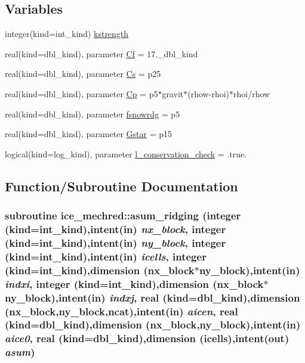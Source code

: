 \subsection*{Variables}
\begin{DoxyCompactItemize}
\item 
integer(kind=int\_\-kind) \hyperlink{namespaceice__mechred_a2272185e4ee38f92dbb9908fca1dac0a}{kstrength}
\item 
real(kind=dbl\_\-kind), parameter \hyperlink{namespaceice__mechred_ae649373b3c64951beea9cf6d3436124a}{Cf} = 17.\_\-dbl\_\-kind
\item 
real(kind=dbl\_\-kind), parameter \hyperlink{namespaceice__mechred_a0cca318f045e71a7ff69619f4186399c}{Cs} = p25
\item 
real(kind=dbl\_\-kind), parameter \hyperlink{namespaceice__mechred_ae1333fb1d2c19a54662644143d18489c}{Cp} = p5$\ast$gravit$\ast$(rhow-\/rhoi)$\ast$rhoi/rhow
\item 
real(kind=dbl\_\-kind), parameter \hyperlink{namespaceice__mechred_a528a8cc57e3a5cb9d679d26baa6cec27}{fsnowrdg} = p5
\item 
real(kind=dbl\_\-kind), parameter \hyperlink{namespaceice__mechred_a85e0edec0423e8de65aaa8ddfa61d02e}{Gstar} = p15
\item 
logical(kind=log\_\-kind), parameter \hyperlink{namespaceice__mechred_a28f8598357ef3851a6288dfdd581732d}{l\_\-conservation\_\-check} = .true.
\end{DoxyCompactItemize}


\subsection{Function/Subroutine Documentation}
\hypertarget{namespaceice__mechred_a0b56099ad3d0f301b3dfaab8aba87ef4}{
\subsubsection[{asum\_\-ridging}]{\setlength{\rightskip}{0pt plus 5cm}subroutine ice\_\-mechred::asum\_\-ridging (integer (kind=int\_\-kind),intent(in) {\em nx\_\-block}, \/  integer (kind=int\_\-kind),intent(in) {\em ny\_\-block}, \/  integer (kind=int\_\-kind),intent(in) {\em icells}, \/  integer (kind=int\_\-kind),dimension (nx\_\-block$\ast$ny\_\-block),intent(in) {\em indxi}, \/  integer (kind=int\_\-kind),dimension (nx\_\-block$\ast$ny\_\-block),intent(in) {\em indxj}, \/  real (kind=dbl\_\-kind),dimension (nx\_\-block,ny\_\-block,ncat),intent(in) {\em aicen}, \/  real (kind=dbl\_\-kind),dimension (nx\_\-block,ny\_\-block),intent(in) {\em aice0}, \/  real (kind=dbl\_\-kind),dimension (icells),intent(out) {\em asum})}}
\label{namespaceice__mechred_a0b56099ad3d0f301b3dfaab8aba87ef4}


